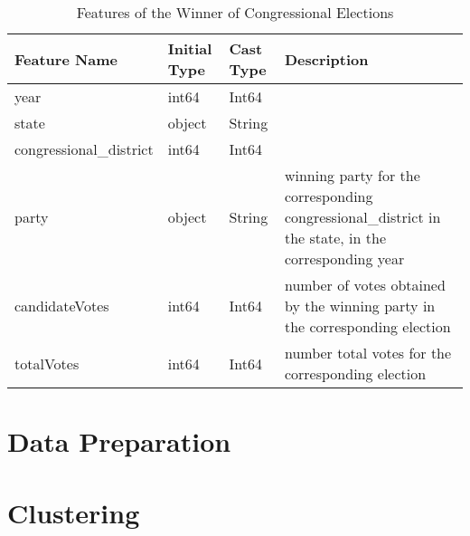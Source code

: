 \documentclass[10pt,a4paper]{report}
\begin{document}
\begin{table}
	\centering
	\begin{tabular}{|l|l|l|p{7cm}|}
		\hline
		Feature Name & Initial Type & Cast Type & Description\\
		\hline
		year & int64 & Int64 & \\
		\hline
		state & object & String & \\
		\hline
		congressional\_district & int64 & Int64 & \\
		\hline
		party & object & String & winning party for the corresponding congressional\_district in the state, in the corresponding year\\
		\hline
		candidateVotes & int64 & Int64 & number of votes obtained by the winning party in the corresponding election\\
		\hline
		totalVotes & int64 & Int64 & number total votes for the corresponding election\\
		\hline
	\end{tabular}
	\caption{Features of the Winner of Congressional Elections}
	\label{table03}
\end{table}

\chapter{Data Preparation}

\chapter{Clustering}
\end{document}
